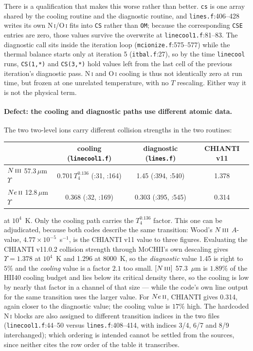 \documentclass[english,a4paper]{my_memo}
\newcommand{\code}[1]{\texttt{#1}}
\newcommand{\MoCHII}{\textsc{MoCHII}}
\newcommand{\OI}{O\,\textsc{i}}
\newcommand{\NI}{N\,\textsc{i}}
\newcommand{\NIII}{N\,\textsc{iii}}
\newcommand{\NeII}{Ne\,\textsc{ii}}
\begin{document}
There is a qualification that makes this worse rather than better.  \code{cs}
is one array shared by the cooling routine and the diagnostic routine, and
\code{lines.f}:406--428 writes its own \NI{}/\OI{} fits into \code{CS} rather
than \code{OM}; because the corresponding \code{CSE} entries are zero, those
values survive the overwrite at \code{linecool1.f}:81--83.  The diagnostic call
sits inside the iteration loop (\code{mcionize.f}:575--577) while the thermal
balance starts only at iteration 5 (\code{itbal.f}:27), so by the time
\code{linecool} runs, \code{CS(1,*)} and \code{CS(3,*)} hold values left from
the last cell of the previous iteration's diagnostic pass.  \NI{} and \OI{}
cooling is thus not identically zero at run time, but frozen at one unrelated
temperature, with no $T$ rescaling.  Either way it is not the physical term.

\paragraph{Defect: the cooling and diagnostic paths use different atomic data.}
The two two-level ions carry different collision strengths in the two routines:

\begin{center}
\begin{tabular}{lccc}
\toprule
 & cooling (\code{linecool1.f}) & diagnostic (\code{lines.f}) & CHIANTI v11 \\
\midrule
$\NIII{}$ 57.3\,$\mu$m $\Upsilon$ & 0.701\,$T_4^{0.136}$ (:31, :164) & 1.45 (:394, :540) & 1.378 \\
$\NeII{}$ 12.8\,$\mu$m $\Upsilon$ & 0.368 (:32, :169)                & 0.303 (:395, :545) & 0.314 \\
\bottomrule
\end{tabular}
\end{center}

\noindent
at $10^4$~K.  Only the cooling path carries the $T_4^{0.136}$ factor.  This one
can be adjudicated, because both codes describe the same transition: Wood's
$\NIII{}$ $A$-value, $4.77\times10^{-5}$~s$^{-1}$, is the CHIANTI v11 value to
three figures.  Evaluating the CHIANTI v11.0.2 collision strength through
\MoCHII{}'s own descaling gives $\Upsilon = 1.378$ at $10^4$~K and 1.296 at
8000~K, so the \emph{diagnostic} value 1.45 is right to $5\%$ and the
\emph{cooling} value is a factor $2.1$ too small.  $[\NIII{}]$ 57.3~$\mu$m is
$1.89\%$ of the HII40 cooling budget and lies below its critical density there,
so the cooling is low by nearly that factor in a channel of that size --- while
the code's own line output for the same transition uses the larger value.  For
$\NeII{}$, CHIANTI gives 0.314, again closer to the diagnostic value; the
cooling value is $17\%$ high.  The hardcoded \NI{} blocks are also assigned to
different transition indices in the two files (\code{linecool1.f}:44--50 versus
\code{lines.f}:408--414, with indices 3/4, 6/7 and 8/9 interchanged); which
ordering is intended cannot be settled from the sources, since neither cites
the row order of the table it transcribes.
\end{document}
